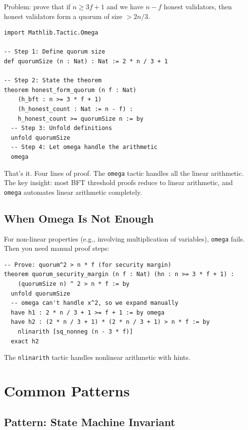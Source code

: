 \documentclass[11pt,a4paper]{article}
\begin{document}
Problem: prove that if $n \geq 3f + 1$ and we have $n - f$ honest validators, then
honest validators form a quorum of size $> 2n/3$.

\begin{lstlisting}[language=Lean,caption={Complete threshold proof, start to finish}]
import Mathlib.Tactic.Omega

-- Step 1: Define quorum size
def quorumSize (n : Nat) : Nat := 2 * n / 3 + 1

-- Step 2: State the theorem
theorem honest_form_quorum (n f : Nat)
    (h_bft : n >= 3 * f + 1)
    (h_honest_count : Nat := n - f) :
    h_honest_count >= quorumSize n := by
  -- Step 3: Unfold definitions
  unfold quorumSize
  -- Step 4: Let omega handle the arithmetic
  omega
\end{lstlisting}

That's it. Four lines of proof. The \texttt{omega} tactic handles all the linear
arithmetic. The key insight: most BFT threshold proofs reduce to linear arithmetic,
and \texttt{omega} automates linear arithmetic completely.

\subsection{When Omega Is Not Enough}

For non-linear properties (e.g., involving multiplication of variables), \texttt{omega}
fails. Then you need manual proof steps:

\begin{lstlisting}[language=Lean,caption={Non-linear threshold proof}]
-- Prove: quorum^2 > n * f (for security margin)
theorem quorum_security_margin (n f : Nat) (hn : n >= 3 * f + 1) :
    (quorumSize n) ^ 2 > n * f := by
  unfold quorumSize
  -- omega can't handle x^2, so we expand manually
  have h1 : 2 * n / 3 + 1 >= f + 1 := by omega
  have h2 : (2 * n / 3 + 1) * (2 * n / 3 + 1) > n * f := by
    nlinarith [sq_nonneg (n - 3 * f)]
  exact h2
\end{lstlisting}

The \texttt{nlinarith} tactic handles nonlinear arithmetic with hints.

\section{Common Patterns}

\subsection{Pattern: State Machine Invariant}
\end{document}

